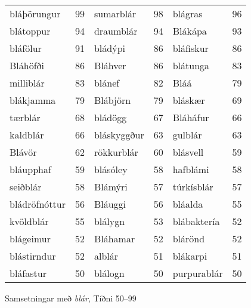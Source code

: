 \documentclass[../samsetningasafn.tex]{subfiles}
\begin{document}
\begin{wordlist}[H]
\begin{tcolorbox}

	\setlength{\extrarowheight}{3pt}
	\begin{tabular}{BlBlBl}
		bláþörungur		& 99		& 		
		sumarblár		& 98		& 	
		blágras			& 96		\\  
		blátoppur		& 94		& 		
		draumblár		& 94		& 		
		Blákápa			& 93		\\ 	
		bláfölur			& 91		& 	
		bládýpi			& 86		& 	
		bláfiskur			& 86		\\ 	
		Bláhöfði			& 86		& 	
		Bláhver			& 86		& 	
		blátunga		& 83		\\ 		
		milliblár			& 83		& 		
		blánef			& 82		& 	
		Bláá			& 79		\\ 		
		blákjamma		& 79		& 	
		Blábjörn			& 79		& 	
		bláskær			& 69		\\ 	
		tærblár			& 68		& 
		bládögg			& 67		& 	
		Bláháfur			& 66		\\ 	
		kaldblár			& 66		& 	
		bláskyggður		& 63		& 	
		gulblár			& 63		\\ 	
		Blávör			& 62		& 	
		rökkurblár		& 60		& 	
		blásvell			& 59		\\ 
		bláupphaf		& 59		& 		
		blásóley			& 58		& 		
		hafblámi			& 58		\\ 	
		seiðblár			& 58		& 	
		Blámýri			& 57		& 	
		túrkísblár		& 57		\\ 	
		bládröfnóttur 	& 56		& 	
		Bláuggi			& 56		& 	
		bláalda			& 55		\\ 
		kvöldblár		& 55		& 	
		blálygn			& 53		& 	
		blábaktería		& 52		\\ 	
		blágeimur		& 52		& 	
		Bláhamar		& 52		& 	
		blárönd			& 52		\\ 
		blástirndur		& 52		& 	
		alblár			& 51		& 	
		blákarpi			& 51		\\ 	
		bláfastur		& 50		& 	
		blálogn			& 50		& 		
		purpurablár		& 50		  	
	\end{tabular}

\end{tcolorbox}
	\caption{Samsetningar með \textit{blár}, Tíðni 50--99}
	\label{listi:blatt.50}
\end{wordlist}
\end{document}
